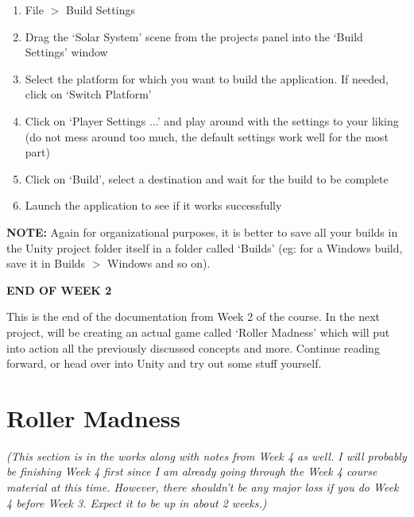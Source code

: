 \documentclass{article}[a4paper,12pt]
\theoremstyle{definition}
\begin{document}
\begin{enumerate}
	\item File $>$ Build Settings
	\item Drag the `Solar System' scene from the projects panel into the `Build Settings' window
	\item Select the platform for which you want to build the application. If needed, click on `Switch Platform'
	\item Click on `Player Settings ...' and play around with the settings to your liking (do not mess around too much, the default settings work well for the most part)
	\item Click on `Build', select a destination and wait for the build to be complete
	\item Launch the application to see if it works successfully
\end{enumerate}
\textbf{NOTE:} Again for organizational purposes, it is better to save all your builds in the Unity project folder itself in a folder called `Builds' (eg: for a Windows build, save it in Builds $>$ Windows and so on).

\hrulefill
\begin{center}\textbf{END OF WEEK 2}\end{center}
This is the end of the documentation from Week 2 of the course. In the next project, will be creating an actual game called `Roller Madness' which will put into action all the previously discussed concepts and more. Continue reading forward, or head over into Unity and try out some stuff yourself.

\hrulefill
\pagebreak
\section{Roller Madness}
\textit{(This section is in the works along with notes from Week 4 as well. I will probably be finishing Week 4 first since I am already going through the Week 4 course material at this time. However, there shouldn't be any major loss if you do Week 4 before Week 3. Expect it to be up in about 2 weeks.)}

\hrulefill
\end{document}
